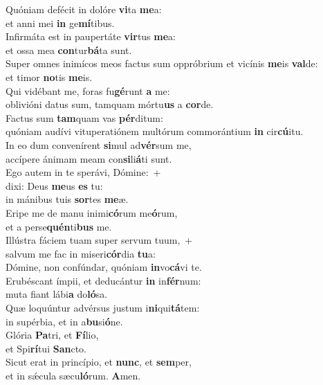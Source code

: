 \evenverse Quóniam defécit in dolóre \textbf{vi}ta \textbf{me}a:~\*\\
\evenverse et anni mei \textbf{in} ge\textbf{mí}tibus.\\
\oddverse Infirmáta est in paupertáte \textbf{vir}tus \textbf{me}a:~\*\\
\oddverse et ossa mea \textbf{con}tur\textbf{bá}ta sunt.\\
\evenverse Super omnes inimícos meos factus sum oppróbrium et vicínis \textbf{me}is \textbf{val}de:~\*\\
\evenverse et timor \textbf{no}tis \textbf{me}is.\\
\oddverse Qui vidébant me, foras fu\textbf{gé}runt \textbf{a} me:~\*\\
\oddverse oblivióni datus sum, tamquam mórtu\textbf{us} a \textbf{cor}de.\\
\evenverse Factus sum \textbf{tam}quam vas \textbf{pér}ditum:~\*\\
\evenverse quóniam audívi vituperatiónem multórum commorántium \textbf{in} cir\textbf{cú}itu.\\
\oddverse In eo dum convenírent \textbf{si}mul ad\textbf{vér}sum me,~\*\\
\oddverse accípere ánimam meam con\textbf{si}li\textbf{á}ti sunt.\\
\evenverse Ego autem in te sperávi, Dómine:~+\\
\evenverse  dixi: Deus \textbf{me}us \textbf{es} tu:~\*\\
\evenverse in mánibus tuis \textbf{sor}tes \textbf{me}æ.\\
\oddverse Eripe me de manu inimi\textbf{có}rum me\textbf{ó}rum,~\*\\
\oddverse et a perse\textbf{quén}ti\textbf{bus} me.\\
\evenverse Illústra fáciem tuam super servum tuum,~+\\
\evenverse  salvum me fac in miseri\textbf{cór}dia \textbf{tu}a:~\*\\
\evenverse Dómine, non confúndar, quóniam \textbf{in}vo\textbf{cá}vi te.\\
\oddverse Erubéscant ímpii, et deducántur \textbf{in} in\textbf{fér}num:~\*\\
\oddverse muta fiant lábi\textbf{a} do\textbf{ló}sa.\\
\evenverse Quæ loquúntur advérsus justum i\textbf{ni}qui\textbf{tá}tem:~\*\\
\evenverse in supérbia, et in a\textbf{bu}si\textbf{ó}ne.\\
\oddverse Glória \textbf{Pa}tri, et \textbf{Fí}lio,~\*\\
\oddverse et Spi\textbf{rí}tui \textbf{San}cto.\\
\evenverse Sicut erat in princípio, et \textbf{nunc}, et \textbf{sem}per,~\*\\
\evenverse et in sǽcula sæcu\textbf{ló}rum. \textbf{A}men.\\
